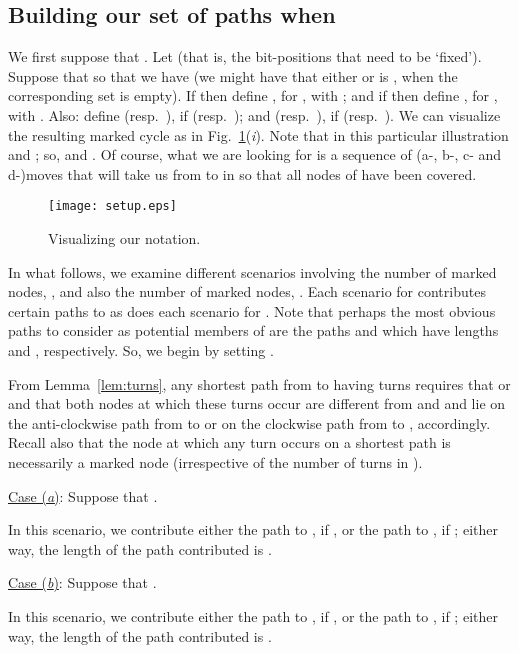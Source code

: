 \documentclass{article}
\newcounter{fig}
\begin{document}
\subsection{Building our set of paths when }\label{distinctsourcedest}

We first suppose that . Let  (that
is, the bit-positions that need to be `fixed'). Suppose that  so that we have  (we might have that
either  or  is , when the corresponding set is empty). If 
then define , for , with
; and if  then define
, for , with
. Also: define 
(resp.\ ), if  (resp.\ ); and  (resp.\
), if  (resp.\ ). We can visualize the resulting marked
cycle  as in Fig.~\ref{setup}(\emph{i\/}). Note that in this
particular illustration  and ; so,  and
. Of course, what we are looking for is a sequence of (a-, b-, c-
and d-)moves that will take us from  to  in  so that all
nodes of  have been covered.

\begin{figure}[t]
\centering
\texttt{[image: setup.eps]}
\caption{Visualizing our notation.}\label{setup}
\end{figure}

In what follows, we examine different scenarios involving the number of marked nodes, , and also the number of marked nodes, . Each scenario for  contributes certain paths to  as does each scenario for . Note that perhaps the most obvious paths to consider as potential members of  are the paths  and  which have lengths  and , respectively. So, we begin by setting .

From Lemma~\ref{lem:turns}, any shortest path  from  to  having  turns requires that  or  and that both nodes at which these turns occur are different from  and  and lie on the anti-clockwise path from  to  or on the clockwise path from  to , accordingly. Recall also that the node at which any turn occurs on a shortest path  is necessarily a marked node (irrespective of the number of turns in ).\smallskip

\noindent\underline{Case (\emph{a\/})}: Suppose that .\smallskip

\noindent In this scenario, we contribute either the path  to , if , or the path  to , if ; either way, the length of the path contributed is .\smallskip

\noindent\underline{Case (\emph{b\/})}: Suppose that .\smallskip

\noindent In this scenario, we contribute either the path  to , if , or the path  to , if ; either way, the length of the path contributed is .\smallskip
\end{document}
